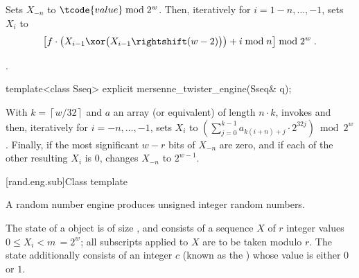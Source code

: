\begin{itemdescr}
\pnum
\effects
Sets $X_{-n}$ to $\tcode{value} \bmod 2^w$.
Then, iteratively for $i = 1 - n, \dotsc, -1$, sets $X_i$ to
\[%
 \bigl[f \cdot
       \bigl(X_{i-1} \xor \bigl(X_{i-1} \rightshift (w-2)\bigr)
       \bigr)
       + i \bmod n
 \bigr] \bmod 2^w
\; \mbox{.}
\]%

\pnum
\complexity
{}.
\end{itemdescr}

\begin{indexed}{}
\begin{itemdecl}
template<class Sseq> explicit mersenne_twister_engine(Sseq& q);
\end{itemdecl}
\end{indexed}

\begin{itemdescr}
\pnum
\effects
 With
 $k = \left\lceil w / 32 \right\rceil$
 and $a$ an array (or equivalent)
 of length $n \cdot k$,
 invokes 
 and then, iteratively for $i = -n,\dotsc,-1$,
 sets $X_i$
 to $\left(\sum_{j=0}^{k-1}a_{k(i+n)+j} \cdot 2^{32j} \right) \bmod 2^w$.
 Finally,
 if the most significant $w-r$ bits of $X_{-n}$
 are zero,
 and if each of the other resulting $X_i$ is $0$,
 changes $X_{-n}$
 to $ 2^{w-1} $.
\end{itemdescr}


[rand.eng.sub]{Class template }%
%

\pnum
A  random number engine
produces unsigned integer random numbers.

\pnum
The state%
%
of a  object 
is of size
,
and consists of
a sequence $X$ of $r$ integer values $0 \leq X_i < m \,= 2^w$;
all subscripts applied to $X$ are to be taken modulo $r$.
The state 
additionally consists of an integer $c$
(known as the )%
%
whose value is either $0$ or $1$.

